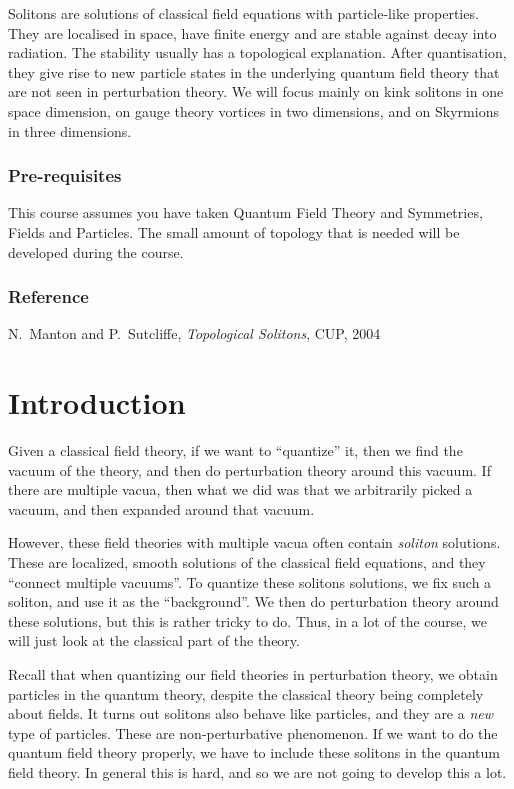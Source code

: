 \documentclass[a4paper]{article}
\begin{document}
\maketitle
{\small
\setlength{\parindent}{0em}
\setlength{\parskip}{1em}
Solitons are solutions of classical field equations with particle-like properties. They are localised in space, have finite energy and are stable against decay into radiation. The stability usually has a topological explanation. After quantisation, they give rise to new particle states in the underlying quantum field theory that are not seen in perturbation theory. We will focus mainly on kink solitons in one space dimension, on gauge theory vortices in two dimensions, and on Skyrmions in three dimensions.

\subsubsection*{Pre-requisites}
This course assumes you have taken Quantum Field Theory and Symmetries, Fields and Particles. The small amount of topology that is needed will be developed during the course.
\subsubsection*{Reference}
N.\ Manton and P.\ Sutcliffe, \emph{Topological Solitons}, CUP, 2004
}
\tableofcontents

\setcounter{section}{-1}
\section{Introduction}
Given a classical field theory, if we want to ``quantize'' it, then we find the vacuum of the theory, and then do perturbation theory around this vacuum. If there are multiple vacua, then what we did was that we arbitrarily picked a vacuum, and then expanded around that vacuum.

However, these field theories with multiple vacua often contain \emph{soliton} solutions. These are localized, smooth solutions of the classical field equations, and they ``connect multiple vacuums''. To quantize these solitons solutions, we fix such a soliton, and use it as the ``background''. We then do perturbation theory around these solutions, but this is rather tricky to do. Thus, in a lot of the course, we will just look at the classical part of the theory.

Recall that when quantizing our field theories in perturbation theory, we obtain particles in the quantum theory, despite the classical theory being completely about fields. It turns out solitons also behave like particles, and they are a \emph{new} type of particles. These are non-perturbative phenomenon. If we want to do the quantum field theory properly, we have to include these solitons in the quantum field theory. In general this is hard, and so we are not going to develop this a lot.
\end{document}
